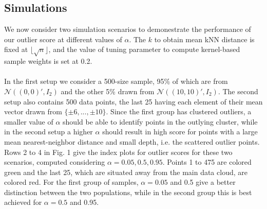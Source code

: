 \documentclass[10pt]{article}
\begin{document}
\subsection{Simulations}We now consider two simulation scenarios to demonestrate the performance of our outlier score at different values of $\alpha$. The $k$ to obtain mean kNN distance is fixed at $\lfloor \sqrt{n} \rfloor$, and the value of tuning parameter to compute kernel-based sample weights is set at 0.2.

\paragraph{}In the first setup we consider a 500-size sample, 95\% of which are from $\mathcal{N}((0,0)',I_2)$ and the other 5\% drawn from $\mathcal{N}((10,10)',I_2)$. The second setup also contains 500 data points, the last 25 having each element of their mean vector drawn from $\{\pm 6, ..., \pm 10\}$. Since the first group has clustered outliers, a smaller value of $\alpha$ should be able to identify points in the outlying cluster, while in the second setup a higher $\alpha$ should result in high score for points with a large mean nearest-neighbor distance and small depth, i.e. the scattered outlier points. Rows 2 to 4 in Fig. 1 give the index plots for outlier scores for these two scenarios, computed considering $\alpha = 0.05, 0.5, 0.95$. Points 1 to 475 are colored green and the last 25, which are situated away from the main data cloud, are colored red. For the first group of samples, $\alpha = 0.05$ and 0.5 give a better distinction between the two populations, while in the second group this is best achieved for $\alpha=0.5$ and 0.95.
\end{document}
